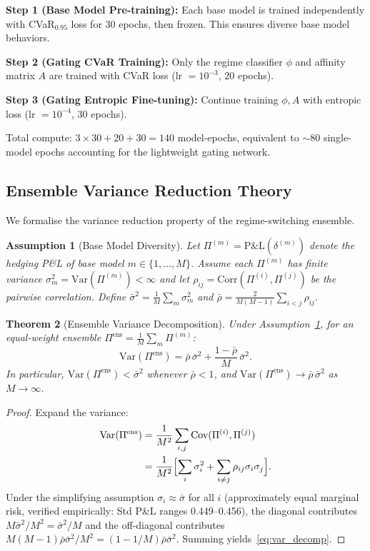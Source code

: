 \documentclass[11pt]{article}
\newtheorem{theorem}{Theorem}[section]
\newtheorem{assumption}[theorem]{Assumption}
\begin{document}
\textbf{Step 1 (Base Model Pre-training):} Each base model is trained independently with CVaR$_{0.95}$ loss for 30 epochs, then frozen. This ensures diverse base model behaviors.

\textbf{Step 2 (Gating CVaR Training):} Only the regime classifier $\phi$ and affinity matrix $A$ are trained with CVaR loss (lr $= 10^{-3}$, 20 epochs).

\textbf{Step 3 (Gating Entropic Fine-tuning):} Continue training $\phi, A$ with entropic loss (lr $= 10^{-4}$, 30 epochs).

Total compute: $3 \times 30 + 20 + 30 = 140$ model-epochs, equivalent to $\sim$80 single-model epochs accounting for the lightweight gating network.

\subsection{Ensemble Variance Reduction Theory}

We formalise the variance reduction property of the regime-switching ensemble.

\begin{assumption}[Base Model Diversity]
\label{ass:diversity}
Let $\Pi^{(m)} = \mathrm{P\&L}(\delta^{(m)})$ denote the hedging P\&L of base model $m\in\{1,\ldots,M\}$.  Assume each $\Pi^{(m)}$ has finite variance $\sigma_m^2 = \mathrm{Var}(\Pi^{(m)}) < \infty$ and let $\rho_{ij} = \mathrm{Corr}(\Pi^{(i)}, \Pi^{(j)})$ be the pairwise correlation.  Define $\bar\sigma^2 = \frac{1}{M}\sum_m \sigma_m^2$ and $\bar\rho = \frac{2}{M(M-1)}\sum_{i<j}\rho_{ij}$.
\end{assumption}

\begin{theorem}[Ensemble Variance Decomposition]
\label{thm:variance}
Under Assumption~\ref{ass:diversity}, for an equal-weight ensemble $\Pi^{\mathrm{ens}} = \frac{1}{M}\sum_m \Pi^{(m)}$:
\begin{equation}
    \mathrm{Var}(\Pi^{\mathrm{ens}}) = \bar\rho\,\bar\sigma^2 + \frac{1-\bar\rho}{M}\,\bar\sigma^2.
    \label{eq:var_decomp}
\end{equation}
In particular, $\mathrm{Var}(\Pi^{\mathrm{ens}}) < \bar\sigma^2$ whenever $\bar\rho < 1$, and $\mathrm{Var}(\Pi^{\mathrm{ens}}) \to \bar\rho\,\bar\sigma^2$ as $M\to\infty$.
\end{theorem}

\begin{proof}
Expand the variance:
\begin{align}
    \mathrm{Var}(\Pi^{\mathrm{ens}})
    &= \frac{1}{M^2}\sum_{i,j}\mathrm{Cov}(\Pi^{(i)},\Pi^{(j)}) \notag\\
    &= \frac{1}{M^2}\Bigl[\sum_i \sigma_i^2 + \sum_{i\neq j}\rho_{ij}\sigma_i\sigma_j\Bigr]. \label{eq:var_expand}
\end{align}
Under the simplifying assumption $\sigma_i \approx \bar\sigma$ for all $i$ (approximately equal marginal risk, verified empirically: Std P\&L ranges 0.449--0.456), the diagonal contributes $M\bar\sigma^2/M^2 = \bar\sigma^2/M$ and the off-diagonal contributes $M(M-1)\bar\rho\bar\sigma^2/M^2 = (1-1/M)\bar\rho\bar\sigma^2$.  Summing yields~\eqref{eq:var_decomp}.
\end{proof}
\end{document}
